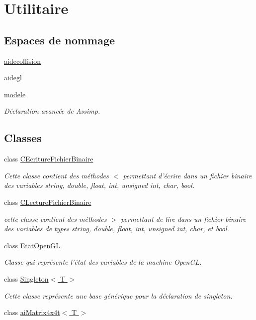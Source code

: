 \hypertarget{group__utilitaire}{\section{Utilitaire}
\label{group__utilitaire}
}
\subsection*{Espaces de nommage}
\begin{DoxyCompactItemize}
\item 
\hyperlink{namespaceaidecollision}{aidecollision}
\item 
\hyperlink{namespaceaidegl}{aidegl}
\item 
\hyperlink{namespacemodele}{modele}
\begin{DoxyCompactList}\small\item\em Déclaration avancée de Assimp. \end{DoxyCompactList}\end{DoxyCompactItemize}
\subsection*{Classes}
\begin{DoxyCompactItemize}
\item 
class \hyperlink{class_c_ecriture_fichier_binaire}{C\-Ecriture\-Fichier\-Binaire}
\begin{DoxyCompactList}\small\item\em Cette classe contient des méthodes $<$ permettant d'écrire dans un fichier binaire des variables string, double, float, int, unsigned int, char, bool. \end{DoxyCompactList}\item 
class \hyperlink{class_c_lecture_fichier_binaire}{C\-Lecture\-Fichier\-Binaire}
\begin{DoxyCompactList}\small\item\em cette classe contient des méthodes $>$ permettant de lire dans un fichier binaire des variables de types string, double, float, int, unsigned int, char, et bool. \end{DoxyCompactList}\item 
class \hyperlink{class_etat_open_g_l}{Etat\-Open\-G\-L}
\begin{DoxyCompactList}\small\item\em Classe qui représente l'état des variables de la machine Open\-G\-L. \end{DoxyCompactList}\item 
class \hyperlink{class_singleton}{Singleton$<$ T $>$}
\begin{DoxyCompactList}\small\item\em Cette classe représente une base générique pour la déclaration de singleton. \end{DoxyCompactList}\item 
class \hyperlink{classai_matrix4x4t}{ai\-Matrix4x4t$<$ T $>$}
\end{DoxyCompactItemize}
